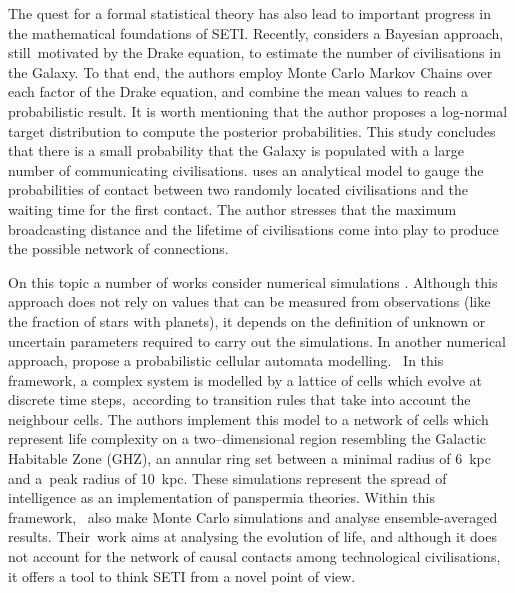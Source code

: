 \documentclass[crop]{CSLB}
\begin{document}
The quest for a formal statistical theory has also lead to important
progress in the mathematical foundations of SETI.
%
Recently, \citet{bloetscher_using_2019} considers a Bayesian approach,
still motivated by the Drake equation, to estimate the number of
civilisations in the Galaxy.
%
To that end, the authors employ Monte Carlo Markov Chains over each
factor of the Drake equation, and combine the mean values to reach a
probabilistic result.
%
It is worth mentioning that the author proposes a log-normal target
distribution to compute the posterior probabilities.
%
This study concludes that there is a small probability that the Galaxy
is populated with a large number of communicating civilisations.
%
\citet{smith_broadcasting_2009} uses an analytical model to gauge the
probabilities of contact between two randomly located civilisations
and the waiting time for the first contact.
%
The author stresses that the maximum broadcasting distance and the
lifetime of civilisations come into play to produce the possible
network of connections.



On this topic a number of works consider numerical simulations
\citep{forgan_evaluating_2015, vukotic_grandeur_2016,
murante_simulating_2015, forgan_numerical_2009, forgan_galactic_2017,
ramirez_new_2017}.
%
Although this approach does not rely on values that can be measured
from observations (like the fraction of stars with planets), it
depends on the definition of unknown or uncertain parameters required
to carry out the simulations.
%
In another numerical approach, \citet{vukotic_astrobiological_2012}
propose a probabilistic cellular automata modelling. 
%
In this framework, a complex system is modelled by a lattice of cells
which evolve at discrete time steps, according to transition rules
that take into account the neighbour cells.
%
The authors implement this model to a network of cells which represent
life complexity on a two--dimensional region resembling the Galactic
Habitable Zone (GHZ), an annular ring set between a minimal radius of
6~kpc and a peak radius of 10~kpc.
%
These simulations represent the spread of intelligence as an
implementation of panspermia theories.
%
Within this framework, \citet{vukotic_astrobiological_2012} also make
Monte Carlo simulations and analyse ensemble-averaged results.
%
Their work aims at analysing the evolution of life, and although it
does not account for the network of causal contacts among
technological civilisations, it offers a tool to think SETI from a
novel point of view.
\end{document}
